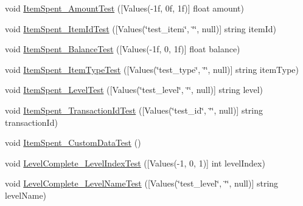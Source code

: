 \begin{DoxyCompactItemize}
\item 
void \mbox{\hyperlink{class_unity_engine_1_1_analytics_1_1_tests_1_1_analytics_event_tests_a29a0cc781b0776cc9fed64f0f320a671}{Item\+Spent\+\_\+\+Amount\+Test}} (\mbox{[}Values(-\/1f, 0f, 1f)\mbox{]} float amount)
\item 
void \mbox{\hyperlink{class_unity_engine_1_1_analytics_1_1_tests_1_1_analytics_event_tests_ad60de9bd1b1c0982fe9742da7959c08d}{Item\+Spent\+\_\+\+Item\+Id\+Test}} (\mbox{[}Values(\char`\"{}test\+\_\+item\char`\"{}, \char`\"{}\char`\"{}, null)\mbox{]} string item\+Id)
\item 
void \mbox{\hyperlink{class_unity_engine_1_1_analytics_1_1_tests_1_1_analytics_event_tests_a720e56a22997a75b3a9f042108f9ef79}{Item\+Spent\+\_\+\+Balance\+Test}} (\mbox{[}Values(-\/1f, 0, 1f)\mbox{]} float balance)
\item 
void \mbox{\hyperlink{class_unity_engine_1_1_analytics_1_1_tests_1_1_analytics_event_tests_a70dc4e03d33cf66d7c33656e4a8eedf5}{Item\+Spent\+\_\+\+Item\+Type\+Test}} (\mbox{[}Values(\char`\"{}test\+\_\+type\char`\"{}, \char`\"{}\char`\"{}, null)\mbox{]} string item\+Type)
\item 
void \mbox{\hyperlink{class_unity_engine_1_1_analytics_1_1_tests_1_1_analytics_event_tests_a5f3bfe78e8056c3e9ff5238bf7fb1c93}{Item\+Spent\+\_\+\+Level\+Test}} (\mbox{[}Values(\char`\"{}test\+\_\+level\char`\"{}, \char`\"{}\char`\"{}, null)\mbox{]} string level)
\item 
void \mbox{\hyperlink{class_unity_engine_1_1_analytics_1_1_tests_1_1_analytics_event_tests_a7a301640f7a2fbd342f07ae3cb892f66}{Item\+Spent\+\_\+\+Transaction\+Id\+Test}} (\mbox{[}Values(\char`\"{}test\+\_\+id\char`\"{}, \char`\"{}\char`\"{}, null)\mbox{]} string transaction\+Id)
\item 
void \mbox{\hyperlink{class_unity_engine_1_1_analytics_1_1_tests_1_1_analytics_event_tests_ac7a1599e935daf864875a803ac998229}{Item\+Spent\+\_\+\+Custom\+Data\+Test}} ()
\item 
void \mbox{\hyperlink{class_unity_engine_1_1_analytics_1_1_tests_1_1_analytics_event_tests_aaac526435bbb2b78cc473952077d9e04}{Level\+Complete\+\_\+\+Level\+Index\+Test}} (\mbox{[}Values(-\/1, 0, 1)\mbox{]} int level\+Index)
\item 
void \mbox{\hyperlink{class_unity_engine_1_1_analytics_1_1_tests_1_1_analytics_event_tests_a2e610929b28ed22b84b4686027bb3ce4}{Level\+Complete\+\_\+\+Level\+Name\+Test}} (\mbox{[}Values(\char`\"{}test\+\_\+level\char`\"{}, \char`\"{}\char`\"{}, null)\mbox{]} string level\+Name)

\end{DoxyCompactItemize}
